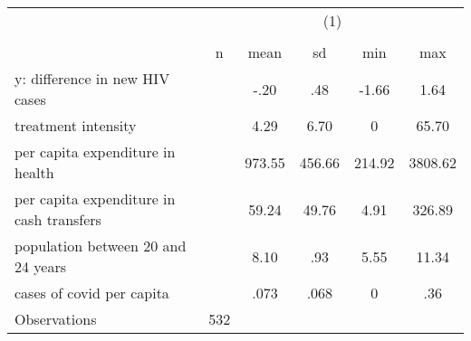 {
\def\sym#1{\ifmmode^{#1}\else\(^{#1}\)\fi}
\begin{tabular}{l*{1}{ccccc}}
\hline\hline
                    &\multicolumn{5}{c}{(1)}                                         \\
                    &\multicolumn{5}{c}{}                                            \\
                    &           n&        mean&          sd&         min&         max\\
\hline
y: difference in new HIV cases&            &   -.20&    .48&   -1.66&    1.64\\
treatment intensity &            &    4.29&    6.70&           0&    65.70\\
per capita expenditure in health&            &    973.55&    456.66&      214.92&     3808.62\\
per capita expenditure in cash transfers&            &    59.24&    49.76&        4.91&      326.89\\
population between 20 and 24 years&            &    8.10&    .93&        5.55&       11.34\\
cases of covid per capita&            &    .073&    .068&           0&    .36\\
\hline
Observations        &         532&            &            &            &            \\
\hline\hline
\end{tabular}
}
